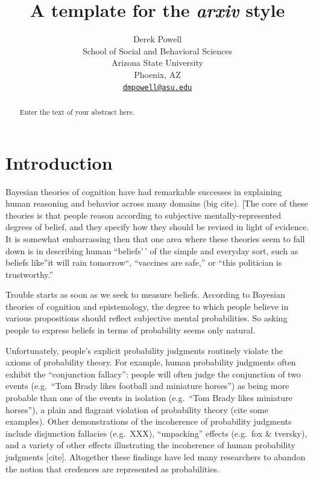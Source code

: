 \documentclass{article}
\title{A template for the \emph{arxiv} style}
\author{
    Derek Powell
   \\
    School of Social and Behavioral Sciences \\
    Arizona State University \\
  Phoenix, AZ \\
  \texttt{\href{mailto:dmpowell@asu.edu}{\nolinkurl{dmpowell@asu.edu}}} \\
  }
\begin{document}
\maketitle

\def\tightlist{}


\begin{abstract}
Enter the text of your abstract here.
\end{abstract}


\hypertarget{introduction}{%
\section{Introduction}\label{introduction}}

Bayesian theories of cognition have had remarkable successes in
explaining human reasoning and behavior across many domains (big cite).
{[}The core of these theories is that people reason according to
subjective mentally-represented degrees of belief, and they specify how
they should be revised in light of evidence. It is somewhat embarrassing
then that one area where these theories seem to fall down is in
describing human ``beliefs'\,' of the simple and everyday sort, such as
beliefs like''it will rain tomorrow``, ``vaccines are safe,'' or ``this
politician is trustworthy.''

Trouble starts as soon as we seek to measure beliefs. According to
Bayesian theories of cognition and epistemology, the degree to which
people believe in various propositions should reflect subjective mental
probabilities. So asking people to express beliefs in terms of
probability seems only natural.

Unfortunately, people's explicit probability judgments routinely violate
the axioms of probability theory. For example, human probability
judgments often exhibit the ``conjunction fallacy'': people will often
judge the conjunction of two events (e.g.~``Tom Brady likes football and
miniature horses'') as being more probable than one of the events in
isolation (e.g.~``Tom Brady likes miniature horses''), a plain and
flagrant violation of probability theory (cite some examples). Other
demonstrations of the incoherence of probability judgments include
disjunction fallacies (e.g.~XXX), ``unpacking'' effects (e.g.~fox \&
tversky), and a variety of other effects illustrating the incoherence of
human probability judgments {[}cite{]}. Altogether these findings have
led many researchers to abandon the notion that credences are
represented as probabilities.
\end{document}
